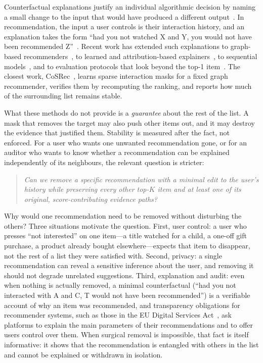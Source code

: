 \documentclass[11pt]{article}
\begin{document}
Counterfactual explanations justify an individual algorithmic decision by naming a small change to the input that
would have produced a different output~\cite{wachter2017counterfactual}. In recommendation, the input a user controls
is their interaction history, and an explanation takes the form ``had you not watched X and Y, you would not have been
recommended Z''~\cite{ghazimatin2020prince,tran2021accent}. Recent work has extended such explanations to graph-based
recommenders~\cite{chen2022grease,chen2025grease,medda2024gnnuers}, to learned and attribution-based
explainers~\cite{barkan2024lxr,gurevitch2025lxr,barkan2026spinrec}, to sequential models~\cite{kim2026trace}, and to
evaluation protocols that look beyond the top-1 item~\cite{nguyen2026cfexprec,mohammadi2025beyond}. The closest work,
CoSRec~\cite{zhang2026cosrec}, learns sparse interaction masks for a fixed graph recommender, verifies them by
recomputing the ranking, and reports how much of the surrounding list remains stable.

What these methods do not provide is a \emph{guarantee} about the rest of the list. A mask that removes the target may
also push other items out, and it may destroy the evidence that justified them. Stability is measured after the fact,
not enforced. For a user who wants one unwanted recommendation gone, or for an auditor who wants to know whether a
recommendation can be explained independently of its neighbours, the relevant question is stricter:

\begin{quote}
\emph{Can we remove a specific recommendation with a minimal edit to the user's history while preserving every other
top-$K$ item and at least one of its original, score-contributing evidence paths?}
\end{quote}

Why would one recommendation need to be removed without disturbing the others? Three situations motivate the
question. First, user control: a user who presses ``not interested'' on one item---a title watched for a child, a
one-off gift purchase, a product already bought elsewhere---expects that item to disappear, not the rest of a list
they were satisfied with. Second, privacy: a single recommendation can reveal a sensitive inference about the user,
and removing it should not degrade unrelated suggestions. Third, explanation and audit: even when nothing is actually
removed, a minimal counterfactual (``had you not interacted with A and C, T would not have been recommended'') is a
verifiable account of why an item was recommended, and transparency obligations for recommender systems, such as
those in the EU Digital Services Act~\cite{dsa2022}, ask platforms to explain the main parameters of their
recommendations and to offer users control over them. When surgical removal is impossible, that fact is itself
informative: it shows that the recommendation is entangled with others in the list and cannot be explained or
withdrawn in isolation.
\end{document}
